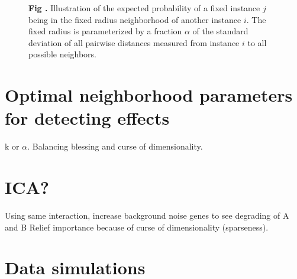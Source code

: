 \documentclass[10pt,letterpaper]{article}\usepackage[]{graphicx}\usepackage[]{color}
\begin{document}
\begin{figure}[ht!]
\centering
\begin{minipage}[h]{0.7\textwidth}
\end{minipage}%
\begin{minipage}[h]{0.3\textwidth}
\noindent{}\textbf{Fig \thefigure \label{fig:gaussPlot}.} Illustration of the expected probability of a fixed instance $j$ being in the fixed radius neighborhood of another instance $i$. The fixed radius is parameterized by a fraction $\alpha$ of the standard deviation of all pairwise distances measured from instance $i$ to all possible neighbors.
\end{minipage}
\end{figure} 

\section{Optimal neighborhood parameters for detecting effects}\label{sec:optim-k}
k or $\alpha$. 
Balancing blessing and curse of dimensionality.


\section{ICA?}

Using same interaction, increase background noise genes to see degrading of A and B Relief importance because of curse of dimensionality (sparseness).  

\section{Data simulations}\label{sec:sim_methods}
\end{document}
